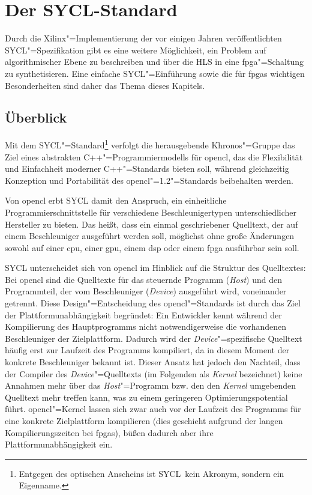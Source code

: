 \chapter{Der SYCL-Standard}\label{sycl}

Durch die Xilinx"=Implementierung der vor einigen Jahren veröffentlichten
SYCL"=Spezifikation gibt es eine weitere Möglichkeit, ein Problem auf
algorithmischer Ebene zu beschreiben und über die HLS in eine
\gls{fpga}"=Schaltung zu synthetisieren. Eine einfache SYCL"=Einführung sowie
die für \gls{fpga}s wichtigen Besonderheiten sind daher das Thema dieses
Kapitels.

\section{Überblick}\label{sycl:ueberblick}

Mit dem SYCL"=Standard\footnote{Entgegen des optischen Anscheins ist
\glqq SYCL\grqq\ kein Akronym, sondern ein Eigenname.}\cite[vgl.][]{sycl2019}
verfolgt die herausgebende Khronos"=Gruppe das Ziel eines abstrakten
C++"=Programmiermodells für \gls{opencl}, das die Flexibilität und Einfachheit
moderner C++"=Standards bieten soll, während gleichzeitig Konzeption und
Portabilität des \gls{opencl}"=1.2"=Standards \cite[vgl.][]{opencl2012}
beibehalten werden.

Von \gls{opencl} erbt SYCL damit den Anspruch, ein einheitliche
Programmierschnittstelle für verschiedene Beschleunigertypen unterschiedlicher
Hersteller zu bieten. Das heißt, dass ein einmal geschriebener Quelltext, der
auf einem Beschleuniger ausgeführt werden soll, möglichst ohne große Änderungen
sowohl auf einer \gls{cpu}, einer \gls{gpu}, einem \gls{dsp} oder einem
\gls{fpga} ausführbar sein soll.

SYCL unterscheidet sich von \gls{opencl} im Hinblick auf die Struktur des
Quelltextes: Bei \gls{opencl} sind die Quelltexte für das steuernde Programm
(\textit{Host}) und den Programmteil, der vom Beschleuniger (\textit{Device})
ausgeführt wird, voneinander getrennt. Diese Design"=Entscheidung des
\gls{opencl}"=Standards ist durch das Ziel der Plattformunabhängigkeit
begründet: Ein Entwickler kennt während der Kompilierung des Hauptprogramms
nicht notwendigerweise die vorhandenen Beschleuniger der Zielplattform. Dadurch
wird der \textit{Device}"=spezifische Quelltext häufig erst zur Laufzeit des
Programms kompiliert, da in diesem Moment der konkrete Beschleuniger bekannt
ist. Dieser Ansatz hat jedoch den Nachteil, dass der Compiler des
\textit{Device}"=Quelltexts (im Folgenden als \textit{Kernel} bezeichnet) keine
Annahmen mehr über das \textit{Host}"=Programm bzw. den den \textit{Kernel}
umgebenden Quelltext mehr treffen kann, was zu einem geringeren
Optimierungspotential führt. \gls{opencl}"=Kernel lassen sich zwar auch vor
der Laufzeit des Programms für eine konkrete Zielplattform kompilieren (dies
geschieht aufgrund der langen Kompilierungszeiten bei \gls{fpga}s), büßen
dadurch aber ihre Plattformunabhängigkeit ein.

